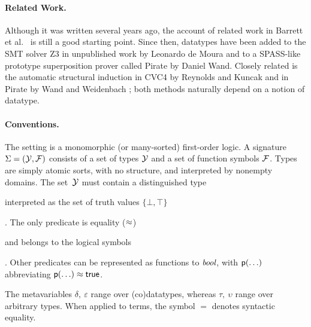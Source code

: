 

\paragraph{Related Work.}
Although it was written several years ago, the account of related work in
Barrett et al.\ \cite{barrett-et-al-2007} is still a good starting point.
Since then, datatypes have been added to the SMT solver
Z3 in unpublished work by Leonardo de Moura and to a SPASS-like prototype
superposition prover called Pirate by Daniel Wand.
Closely related is the automatic structural
induction in CVC4 by Reynolds and Kuncak \cite{reynolds-kuncak-2015} and in
Pirate by Wand and Weidenbach \cite{wand-weidenbach-201x};
both methods naturally depend on a notion of datatype.

% 

\paragraph{Conventions.}
The setting is a monomorphic (or many-sorted) first-order logic.
A signature $\mathrm{\Sigma} = (\mathcal{Y}, \mathcal{F})$ consists of a set of types $\mathcal{Y}$ and a
set of function symbols $\mathcal{F}$. Types are simply atomic sorts, with no
structure, and interpreted by nonempty domains. The set~$\mathcal{Y}$ must contain a
distinguished type \begin{report} interpreted as the set of truth
values $\{\bot, \top\}$\end{report}. %
The only predicate is equality ($\approx$)\begin{report} and belongs to the logical symbols\end{report}.
Other predicates can be represented as functions to $\textit{bool}$,
with $\textsf{p}(\ldots)$ abbreviating $\textsf{p}(\ldots) \approx \textsf{true}$.
\begin{report}
The metavariables $\delta,\:\varepsilon$ range over (co)datatypes,
whereas $\tau,\:\upsilon$ range over arbitrary types.
When applied to terms, the symbol $=$ denotes syntactic equality.\end{report}

